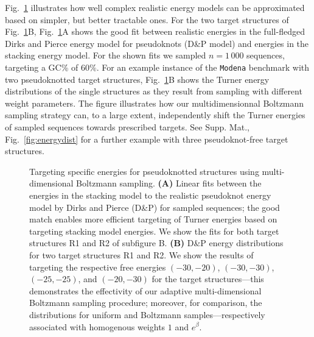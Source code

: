 \documentclass[twocolumn]{bmcart}%
\makeatletter
\newlength{\@aligneps}
\newcommand{\includegraphicstop}[2][]{%
\sbox{\@alignepsbox}{\texttt{[image: \#2]}}%
\setlength{\@aligneps}{-\ht\@alignepsbox}%
\addtolength{\@aligneps}{2ex}%
\raisebox{\@aligneps}{\usebox{\@alignepsbox}}}
\newcommand{\Nuc}[1]{{\sf #1}}
\newcommand{\Cb}{\Nuc{C}}
\newcommand{\Gb}{\Nuc{G}}
\newcommand{\GCb}{\Gb\Cb}
\makeatother
\begin{document}
Fig.~\ref{fig:energydist-pk} illustrates how well complex realistic energy models can be approximated based on simpler, but better tractable ones. For
the two target structures of Fig.~\ref{fig:energydist-pk}B,
Fig.~\ref{fig:energydist-pk}A shows the good fit between realistic
energies in the full-fledged Dirks and Pierce energy model for
pseudoknots (D\&P model) and energies in the stacking energy
model. For the shown fits we sampled $n=1\,000$ sequences, targeting a
\GCb\% of $60\%$.
%
For an example instance of the \texttt{Modena} benchmark with two
pseudoknotted target structures, Fig.~\ref{fig:energydist-pk}B shows
the Turner energy distributions of the single structures as they
result from sampling with different weight parameters. The figure
illustrates how our multidimensionnal Boltzmann sampling strategy can,
to a large extent, independently shift the Turner energies of sampled
sequences towards prescribed targets. See Supp. Mat.,
Fig.~\ref{fig:energydist} for a further example with three
pseudoknot-free target structures.

\begin{figure}[t]
  \begin{center}
    \includegraphicstop[width=0.97\textwidth]{Figs/energy_shift}\hfill
  \end{center}
  \caption{%
    Targeting specific energies for pseudoknotted structures using
    multi-dimensional Boltzmann sampling. \textbf{(A)} Linear fits between the
    energies in the stacking model to the realistic pseudoknot energy
    model by Dirks and Pierce (D\&P) for sampled sequences; the good
    match enables more efficient targeting of Turner energies based on
    targeting stacking model energies.  We show the fits for both
    target structures R1 and R2 of subfigure B.  \textbf{(B)} D\&P energy
    distributions for two target structures R1 and R2. We show the
    results of targeting the respective free energies $(-30,-20)$,
    $(-30,-30)$, $(-25,-25)$, and $(-20,-30)$ for the target
    structures---this demonstrates the effectivity of our adaptive
    multi-dimensional Boltzmann sampling procedure; moreover, for
    comparison, the distributions for uniform and Boltzmann
    samples---respectively associated with homogenous weights $1$ and
    $e^\beta$.
  }
  \label{fig:energydist-pk}
\end{figure}
\end{document}
